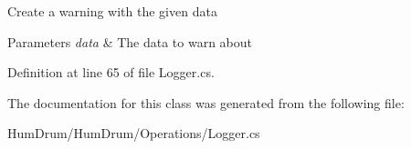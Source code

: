 Create a warning with the given data 


\begin{DoxyParams}{Parameters}
{\em data} & The data to warn about\\
\hline
\end{DoxyParams}


Definition at line 65 of file Logger.\+cs.



The documentation for this class was generated from the following file\+:\begin{DoxyCompactItemize}
\item 
Hum\+Drum/\+Hum\+Drum/\+Operations/Logger.\+cs\end{DoxyCompactItemize}
